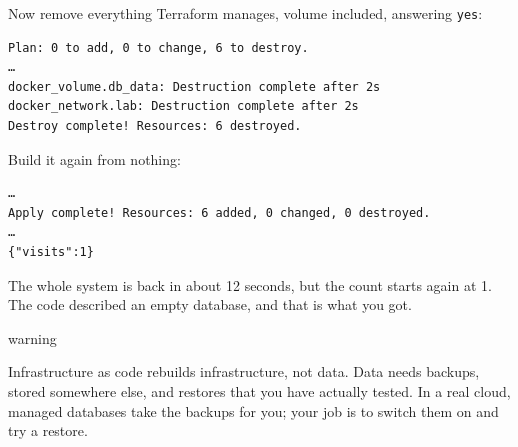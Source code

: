 Now remove everything Terraform manages, volume included, answering \texttt{yes}:

\begin{codeblock}

\begin{Shaded}
\begin{Highlighting}[]
\end{Highlighting}
\end{Shaded}

\end{codeblock}

\begin{codeblock}
\begin{Verbatim}[formatcom=\outputstyle]
Plan: 0 to add, 0 to change, 6 to destroy.
…
docker_volume.db_data: Destruction complete after 2s
docker_network.lab: Destruction complete after 2s
Destroy complete! Resources: 6 destroyed.
\end{Verbatim}
\end{codeblock}


Build it again from nothing:

\begin{codeblock}

\begin{Shaded}
\begin{Highlighting}[]
\end{Highlighting}
\end{Shaded}

\end{codeblock}

\begin{codeblock}
\begin{Verbatim}[formatcom=\outputstyle]
…
Apply complete! Resources: 6 added, 0 changed, 0 destroyed.
…
{"visits":1}
\end{Verbatim}
\end{codeblock}

The whole system is back in about 12 seconds, but the count starts again at 1. The code described an empty database, and that is what you got.

\begin{callout}{warning}

Infrastructure as code rebuilds infrastructure, not data. Data needs backups, stored somewhere else, and restores that you have actually tested. In a real cloud, managed databases take the backups for you; your job is to switch them on and try a restore.

\end{callout}

